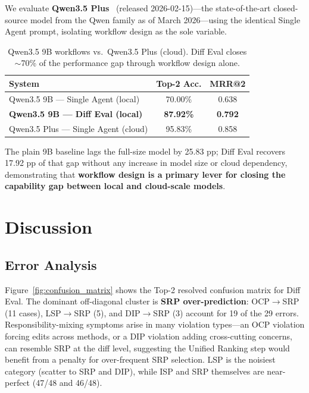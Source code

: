 \documentclass[12pt,a4paper,oneside]{report}
\begin{document}
We evaluate \textbf{Qwen3.5 Plus}~\cite{Qwen2025} (released 2026-02-15)---the state-of-the-art closed-source model from the Qwen family as of March 2026---using the identical Single Agent prompt, isolating workflow design as the sole variable.

\begin{table}[htbp]
\centering
\begin{tabular}{@{}lcc@{}}
\toprule
\textbf{System} & \textbf{Top-2 Acc.} & \textbf{MRR@2} \\
\midrule
Qwen3.5 9B --- Single Agent (local) & 70.00\% & 0.638 \\
\textbf{Qwen3.5 9B --- Diff Eval (local)} & \textbf{87.92\%} & \textbf{0.792} \\
\midrule
Qwen3.5 Plus --- Single Agent (cloud) & 95.83\% & 0.858 \\
\bottomrule
\end{tabular}
\caption{Qwen3.5 9B workflows vs.\ Qwen3.5 Plus (cloud). Diff Eval closes $\sim$70\% of the performance gap through workflow design alone.}
\label{tbl:vs_fullsize}
\end{table}

The plain 9B baseline lags the full-size model by 25.83 pp; Diff Eval recovers 17.92 pp of that gap without any increase in model size or cloud dependency, demonstrating that \textbf{workflow design is a primary lever for closing the capability gap between local and cloud-scale models}.


\chapter{Discussion}
\label{ch:discussion}

\section{Error Analysis}

Figure~\ref{fig:confusion_matrix} shows the Top-2 resolved confusion matrix for Diff Eval. The dominant off-diagonal cluster is \textbf{SRP over-prediction}: OCP$\to$SRP (11 cases), LSP$\to$SRP (5), and DIP$\to$SRP (3) account for 19 of the 29 errors. Responsibility-mixing symptoms arise in many violation types---an OCP violation forcing edits across methods, or a DIP violation adding cross-cutting concerns, can resemble SRP at the diff level, suggesting the Unified Ranking step would benefit from a penalty for over-frequent SRP selection. LSP is the noisiest category (scatter to SRP and DIP), while ISP and SRP themselves are near-perfect (47/48 and 46/48).
\end{document}
